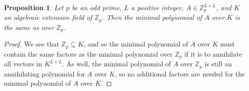 \documentclass[12pt, a4paper, reqno]{amsart}
\newtheorem{prop}{Proposition}
\begin{document}
	\begin{prop}
		\label{prop:staticMinPoly}
		Let $p$ be an odd prime, $L$ a positive integer, $A \in \mathds{Z}_p^{L \times L}$, and $K$ an algebraic extension field of $\mathds{Z}_p$. Then the minimal 
		polynomial of $A$ over $K$ is the same as over $\mathds{Z}_p$.
	\end{prop}
	\begin{proof}
		We see that $\mathds{Z}_p \subseteq K$, and so the minimal polynomial of $A$ over $K$ must contain the same factors as the minimal polynomial over $\mathds{Z}_p$ if 
		it is to annihilate all vectors in $K^{L \times L}$. As well, the minimal polynomial of $A$ over $\mathds{Z}_p$ is still an annihilating polynomial for $A$ over 
		$K$, so no additional factors are needed for the minimal polynomial of $A$ over $K$.
	\end{proof}
	
\end{document}
